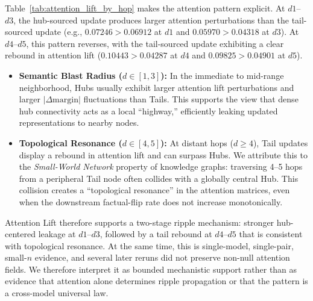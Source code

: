 Table~\ref{tab:attention_lift_by_hop} makes the attention pattern explicit. At $d1$--$d3$, the hub-sourced update produces larger attention perturbations than the tail-sourced update (e.g., $0.07246 > 0.06912$ at $d1$ and $0.05970 > 0.04318$ at $d3$). At $d4$--$d5$, this pattern reverses, with the tail-sourced update exhibiting a clear rebound in attention lift ($0.10443 > 0.04287$ at $d4$ and $0.09825 > 0.04901$ at $d5$).
\begin{itemize}
    \item \textbf{Semantic Blast Radius ($d \in [1, 3]$):} In the immediate to mid-range neighborhood, Hubs usually exhibit larger attention lift perturbations and larger $| \Delta \text{margin} |$ fluctuations than Tails. This supports the view that dense hub connectivity acts as a local ``highway,'' efficiently leaking updated representations to nearby nodes.
    \item \textbf{Topological Resonance ($d \in [4, 5]$):} At distant hops ($d \ge 4$), Tail updates display a rebound in attention lift and can surpass Hubs. We attribute this to the \textit{Small-World Network} property of knowledge graphs: traversing 4--5 hops from a peripheral Tail node often collides with a globally central Hub. This collision creates a ``topological resonance'' in the attention matrices, even when the downstream factual-flip rate does not increase monotonically.
\end{itemize}
Attention Lift therefore supports a two-stage ripple mechanism: stronger hub-centered leakage at $d1$--$d3$, followed by a tail rebound at $d4$--$d5$ that is consistent with topological resonance. At the same time, this is single-model, single-pair, small-$n$ evidence, and several later reruns did not preserve non-null attention fields. We therefore interpret it as bounded mechanistic support rather than as evidence that attention alone determines ripple propagation or that the pattern is a cross-model universal law.

